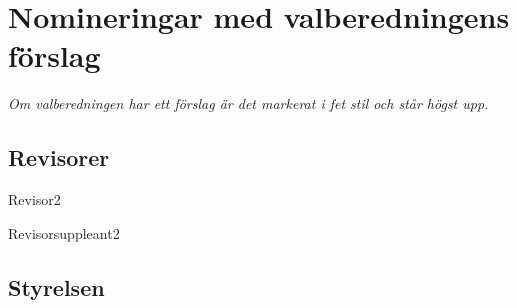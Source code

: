 \documentclass[10pt]{article}
\begin{document}
    \section{Nomineringar med valberedningens förslag}
    \emph{Om valberedningen har ett förslag är det markerat i fet stil och står högst upp.}
        



    \subsection{Revisorer}
    
    \begin{vallista}
        \begin{post}{Revisor}{2}
        \end{post}

        \begin{post}{Revisorsuppleant}{2}
        \end{post}
    \end{vallista}

    \subsection{Styrelsen}
    
\end{document}
